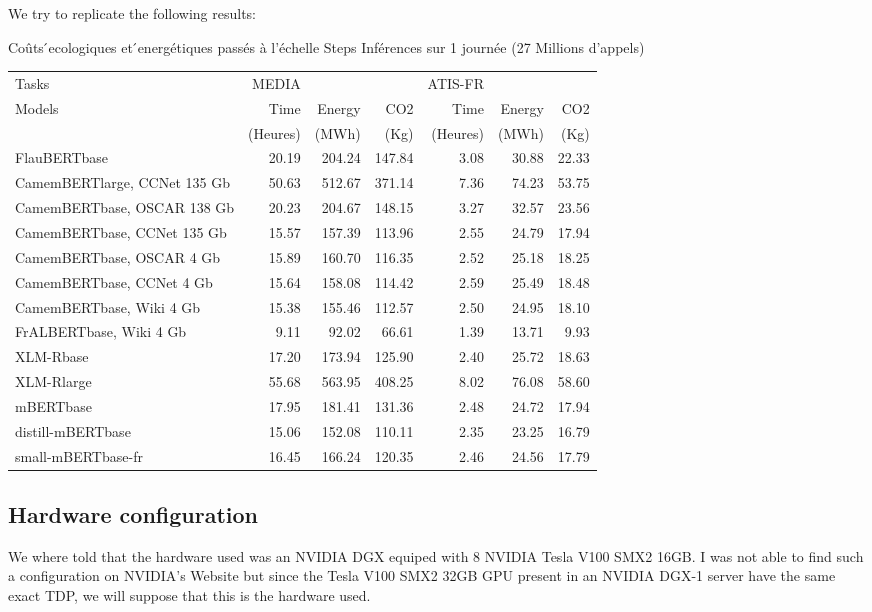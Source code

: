 \documentclass[11pt]{article}
\begin{document}
We try to replicate the following results:

Coûts  ́ecologiques et  ́energétiques passés à l’échelle
Steps Inférences sur 1 journée (27 Millions d’appels)
\begin{center}
\begin{tabular}{lrrrrrr}
Tasks & MEDIA &  &  & ATIS-FR &  & \\
Models & Time & Energy & CO2 & Time & Energy & CO2\\
 & (Heures) & (MWh) & (Kg) & (Heures) & (MWh) & (Kg)\\
FlauBERTbase & 20.19 & 204.24 & 147.84 & 3.08 & 30.88 & 22.33\\
CamemBERTlarge, CCNet 135 Gb & 50.63 & 512.67 & 371.14 & 7.36 & 74.23 & 53.75\\
CamemBERTbase, OSCAR 138 Gb & 20.23 & 204.67 & 148.15 & 3.27 & 32.57 & 23.56\\
CamemBERTbase, CCNet 135 Gb & 15.57 & 157.39 & 113.96 & 2.55 & 24.79 & 17.94\\
CamemBERTbase, OSCAR 4 Gb & 15.89 & 160.70 & 116.35 & 2.52 & 25.18 & 18.25\\
CamemBERTbase, CCNet 4 Gb & 15.64 & 158.08 & 114.42 & 2.59 & 25.49 & 18.48\\
CamemBERTbase, Wiki 4 Gb & 15.38 & 155.46 & 112.57 & 2.50 & 24.95 & 18.10\\
FrALBERTbase, Wiki 4 Gb & 9.11 & 92.02 & 66.61 & 1.39 & 13.71 & 9.93\\
XLM-Rbase & 17.20 & 173.94 & 125.90 & 2.40 & 25.72 & 18.63\\
XLM-Rlarge & 55.68 & 563.95 & 408.25 & 8.02 & 76.08 & 58.60\\
mBERTbase & 17.95 & 181.41 & 131.36 & 2.48 & 24.72 & 17.94\\
distill-mBERTbase & 15.06 & 152.08 & 110.11 & 2.35 & 23.25 & 16.79\\
small-mBERTbase-fr & 16.45 & 166.24 & 120.35 & 2.46 & 24.56 & 17.79\\
\end{tabular}
\end{center}

\subsection{Hardware configuration}
\label{sec:org0d97bcd}

We where told that the hardware used was an NVIDIA DGX equiped with 8
NVIDIA Tesla V100 SMX2 16GB. I was not able to find such a
configuration on NVIDIA's Website but since the Tesla V100 SMX2 32GB
GPU present in an NVIDIA DGX-1 server have the same exact TDP, we will
suppose that this is the hardware used.
\end{document}
